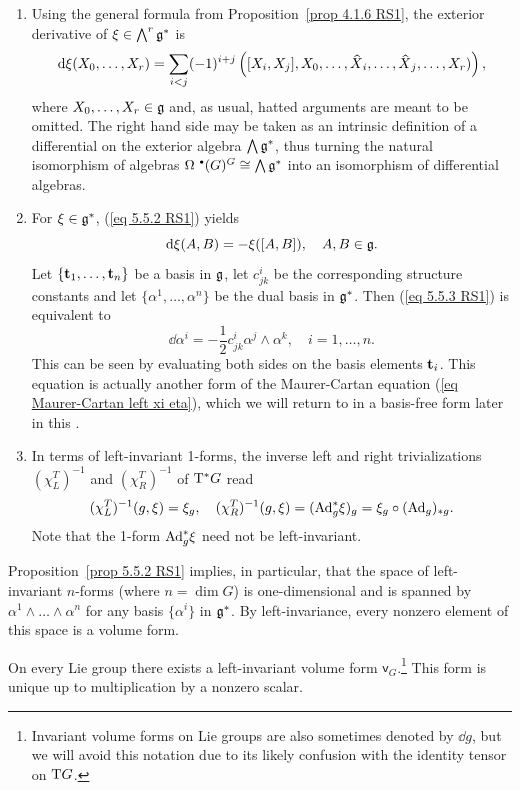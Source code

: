 \begin{rem}
\begin{enumerate}
    \item Using the general formula from Proposition~\ref{prop 4.1.6 RS1}, the exterior derivative of $\xi\in\bigwedge^r\frakg^\ast$ is
    \[\dd\xi(X_0,\ldots,X_r)=\sum_{i<j}(-1)^{i+j}\left([X_i,X_j],X_0,\ldots,\wh{X}_i,\ldots,\wh{X}_j,\ldots,X_r)\right),\label{eq 5.5.2 RS1}\]
    where $X_0,\ldots,X_r\in\frakg$ and, as usual, hatted arguments are meant to be omitted. The right hand side may be taken as an intrinsic definition of a differential on the exterior algebra $\bigwedge\frakg^\ast$, thus turning the natural isomorphism of algebras $\Omega^{\smbullet }(G)^G\cong\bigwedge\frakg^\ast$ into an isomorphism of differential algebras.
    \item For $\xi\in\frakg^\ast$, (\ref{eq 5.5.2 RS1}) yields
    \[\dd\xi(A,B)=-\xi([A,B]),\quad A,B\in\frakg.\label{eq 5.5.3 RS1}\]
    Let $\{\bf{t}_1,\ldots,\bf{t}_n\}$ be a basis in $\frakg$, let $c^i_{jk}$  be the corresponding structure constants and let $\{\alpha^1,\ldots,\alpha^n\}$ be the dual basis in $\frakg^\ast$. Then (\ref{eq 5.5.3 RS1}) is equivalent to
    \[\dd \alpha^i=-\frac 12 c^i_{jk}\alpha^j\wedge \alpha^k,\quad i=1,\ldots,n.\label{eq 5.5.4 RS1 MC in coords}\]
    This can be seen by evaluating both sides on the basis elements $\bf{t}_i$. This equation is actually another form of the Maurer-Cartan equation  (\ref{eq Maurer-Cartan left xi eta}), which we will return to in a basis-free form later in this \subsect.
    \item In terms of left-invariant 1-forms, the inverse left and right trivializations $(\chi_L^T)^{-1}$ and $(\chi_R^T)^{-1}$ of $\T^\ast G$ read
    \[(\chi_L^T)^{-1}(g,\xi)=\xi_g,\quad (\chi_R^T)^{-1}(g,\xi)=(\Ad_{g}^\ast \xi)_g=\xi_g\circ (\Ad_g)_{\ast g}.\]
    Note that the 1-form $\Ad_g^\ast\xi$ need not be left-invariant.
\end{enumerate}
\end{rem}

Proposition~\ref{prop 5.5.2 RS1} implies, in particular, that the space of left-invariant $n$-forms (where $n=\dim G$) is one-dimensional and is spanned by $\alpha^1\wedge\ldots\wedge\alpha^n$ for any basis $\{\alpha^i\}$ in $\frakg^\ast$. By left-invariance, every nonzero element of this space is a volume form.

\begin{cor}
    On every Lie group there exists a left-invariant volume form $\mathsf{v}_G$.\footnote{Invariant volume forms on Lie groups are also sometimes denoted by $\dd g$, but we will avoid this notation due to its likely confusion with the identity tensor on $\T G$.} This form is unique up to multiplication by a nonzero scalar. 
\end{cor}

